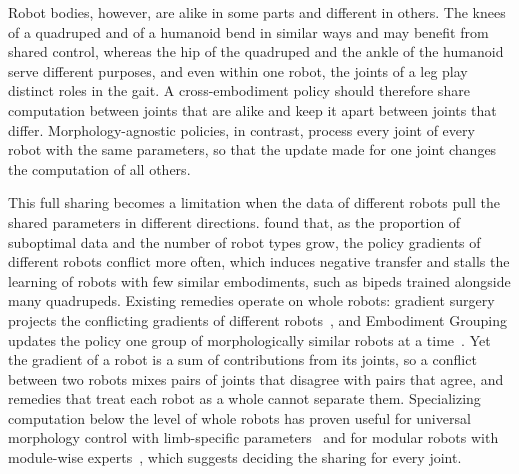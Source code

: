 Robot bodies, however, are alike in some parts and different in others. The knees of a quadruped and of a humanoid
bend in similar ways and may benefit from shared control, whereas the hip of the quadruped and the ankle of the
humanoid serve different purposes, and even within one robot, the joints of a leg play distinct roles in the gait. A
cross-embodiment policy should therefore share computation between joints that are alike and keep it apart between
joints that differ. Morphology-agnostic policies, in contrast, process every joint of every robot with the same
parameters, so that the update made for one joint changes the computation of all others.

This full sharing becomes a limitation when the data of different robots pull the shared parameters in different
directions. \citet{abe2026crossembodimentoffline} found that, as the proportion of suboptimal data and the number of
robot types grow, the policy gradients of different robots conflict more often, which induces negative transfer and
stalls the learning of robots with few similar embodiments, such as bipeds trained alongside many quadrupeds. Existing
remedies operate on whole robots: gradient surgery projects the conflicting gradients of different
robots~\citep{yu2020pcgrad}, and Embodiment Grouping updates the policy one group of morphologically similar robots at a
time~\citep{abe2026crossembodimentoffline}. Yet the gradient of a robot is a sum of contributions from its joints, so a
conflict between two robots mixes pairs of joints that disagree with pairs that agree, and remedies that treat each
robot as a whole cannot separate them. Specializing computation below the level of whole robots has proven useful
for universal morphology control with limb-specific parameters~\citep{xiong2023modumorph} and for modular robots with
module-wise experts~\citep{liu2026m2oe}, which suggests deciding the sharing for every joint.

